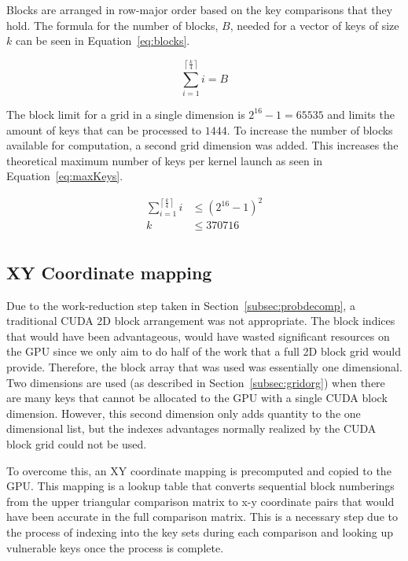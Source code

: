 \documentclass[smallextended]{svjour3}       %
\begin{document}
Blocks are arranged in row-major order based on the key comparisons that they 
hold. The formula for the number of blocks, $B$, needed for a vector of keys of 
size $k$ can be seen in Equation~\ref{eq:blocks}.

\begin{equation}
   \sum_{i=1}^{\left\lceil \frac{k}{4} \right\rceil}i = B
   \label{eq:blocks}
\end{equation}

The block limit for a grid in a single dimension is $2^{16} - 1 = 65535$ 
and limits the amount of keys that can be processed to $1444$. To increase 
the number of blocks available for computation, a second grid dimension was 
added. This increases the theoretical maximum number of keys per kernel 
launch as seen in Equation~\ref{eq:maxKeys}.

\begin{equation}
   \begin{split}
   \sum_{i = 1}^{\left\lceil\frac{k}{4}\right\rceil} i & \leq {\left(2^{16} - 
   1\right)}^2\\
   k & \leq 370716\\
   \end{split}
   \label{eq:maxKeys}
\end{equation}

\subsection{XY Coordinate mapping}
\label{subsubsec:xymap}

Due to the work-reduction step taken in Section~\ref{subsec:probdecomp}, a
traditional CUDA 2D block arrangement was not appropriate. The block indices
that would have been advantageous, would have wasted significant resources on
the GPU since we only aim to do half of the work that a full 2D block grid would
provide. Therefore, the block array that was used was essentially one
dimensional. Two dimensions are used (as described in
Section~\ref{subsec:gridorg}) when there are many keys that cannot be allocated
to the GPU with a single CUDA block dimension. However, this second dimension
only adds quantity to the one dimensional list, but the indexes advantages
normally realized by the CUDA block grid could not be used.

To overcome this, an XY coordinate mapping is precomputed and copied to the
GPU. This mapping is a lookup table that converts sequential block numberings
from the upper triangular comparison matrix to x-y coordinate pairs that would
have been accurate in the full comparison matrix. This is a necessary step due
to the process of indexing into the key sets during each comparison and looking
up vulnerable keys once the process is complete.
\end{document}

